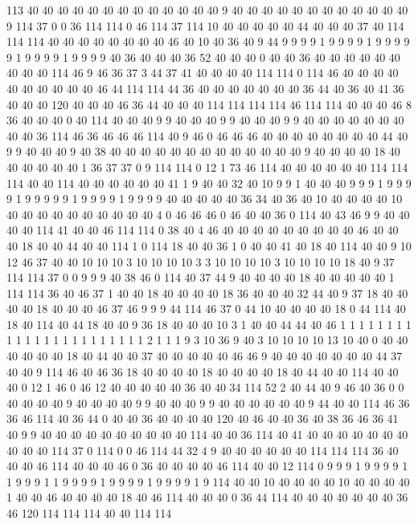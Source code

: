 113 40 40 40 40 40 40 40 40 40 40 40 40 40 9 40 40 40 40 40
40 40 40 40 40 40 40 9 114 37 0 0 36 114 114 0 46 114 37 114
10 40 40 40 40 40 44 40 40 40 37 40 114 114 114 40 40 40 40 40
40 40 40 46 40 10 40 36 40 9 44 9 9 9 9 1 9 9 9 9
1 9 9 9 9 9 1 9 9 9 9 1 9 9 9 9 40 36 40 40
40 36 52 40 40 40 0 40 40 36 40 40 40 40 40 40 40 40 40 114
46 9 46 36 37 3 44 37 41 40 40 40 40 114 114 0 114 46 40 40
40 40 40 40 40 40 40 40 46 44 114 114 44 36 40 40 40 40 40 40
40 36 44 40 36 40 41 36 40 40 40 120 40 40 40 46 36 44 40 40
40 114 114 114 114 46 114 114 40 40 40 46 8 36 40 40 40 0 40 114
40 40 40 9 9 40 40 40 9 9 40 40 40 9 9 40 40 40 40 40
40 40 40 40 36 114 46 36 46 46 46 114 40 9 46 0 46 46 46 40
40 40 40 40 40 40 40 44 40 9 9 40 40 40 9 40 38 40 40 40
40 40 40 40 40 40 40 40 40 40 9 40 40 40 40 18 40 40 40 40
40 40 1 36 37 37 0 9 114 114 0 12 1 73 46 114 40 40 40 40
40 40 114 114 114 40 40 114 40 40 40 40 40 40 41 1 9 40 40 32
40 10 9 9 1 40 40 40 9 9 9 1 9 9 9 9 1 9 9 9
9 9 1 9 9 9 9 1 9 9 9 9 40 40 40 40 40 36 34 40
36 40 10 40 40 40 40 10 40 40 40 40 40 40 40 40 40 40 4 0
46 46 46 0 46 40 40 36 0 114 40 43 46 9 9 40 40 40 40 114
41 40 40 46 114 114 0 38 40 4 46 40 40 40 40 40 40 40 40 40
46 40 40 40 18 40 40 44 40 40 114 1 0 114 18 40 40 36 1 0
40 40 41 40 18 40 114 40 40 9 10 12 46 37 40 40 10 10 10 3
10 10 10 10 3 3 10 10 10 10 3 10 10 10 10 18 40 9 37 114
114 37 0 0 9 9 9 40 38 46 0 114 40 37 44 9 40 40 40 40
18 40 40 40 40 40 1 114 114 36 40 46 37 1 40 40 18 40 40 40
40 18 36 40 40 40 32 44 40 9 37 18 40 40 40 40 18 40 40 40
46 37 46 9 9 9 44 114 46 37 0 44 10 40 40 40 40 18 0 44
114 40 18 40 114 40 44 18 40 40 9 36 18 40 40 40 10 3 1 40
40 44 44 40 46 1 1 1 1 1 1 1 1 1 1 1 1 1 1 1
1 1 1 1 1 1 1 1 2 1 1 1 9 3 10 36 9 40 3 10
10 10 10 13 10 40 0 40 40 40 40 40 40 18 40 44 40 40 37 40
40 40 40 40 46 46 9 40 40 40 40 40 40 40 44 37 40 40 9 114
46 40 46 36 18 40 40 40 40 18 40 40 40 40 18 40 44 40 40 114
40 40 40 0 12 1 46 0 46 12 40 40 40 40 40 36 40 40 34 114
52 2 40 44 40 9 46 40 36 0 0 40 40 40 40 9 40 40 40 40
9 9 40 40 40 9 9 40 40 40 40 40 40 9 44 40 40 114 46 36
36 46 114 40 36 44 0 40 40 36 40 40 40 40 120 40 46 40 40 36
40 38 36 46 36 41 40 9 9 40 40 40 40 40 40 40 40 40 40 114
40 40 36 114 40 41 40 40 40 40 40 40 40 40 40 40 114 37 0 114
0 0 46 114 44 32 4 9 40 40 40 40 40 40 114 114 114 36 40 40
40 46 114 40 40 40 46 0 36 40 40 40 40 46 114 40 40 12 114 0
9 9 9 1 9 9 9 9 1 1 9 9 9 1 1 9 9 9 9 1
9 9 9 9 1 9 9 9 9 1 9 114 40 40 10 40 40 40 40 10
40 40 40 40 1 40 40 46 40 40 40 40 18 40 46 114 40 40 40 0
36 44 114 40 40 40 40 40 40 40 36 46 120 114 114 114 40 40 114 114
